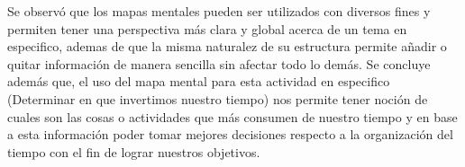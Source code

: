 Se observó que los mapas mentales pueden ser utilizados con diversos fines y permiten tener una perspectiva
más clara y global acerca de un tema en especifico, ademas de que la misma naturalez de su estructura permite
añadir o quitar información de manera sencilla sin afectar todo lo demás. Se concluye además que, el uso
del mapa mental para esta actividad en especifico (Determinar en que invertimos nuestro tiempo) nos permite
tener noción de cuales son las cosas o actividades que más consumen de nuestro tiempo y en base a esta
información poder tomar mejores decisiones respecto a la organización del tiempo con el fin de lograr
nuestros objetivos.